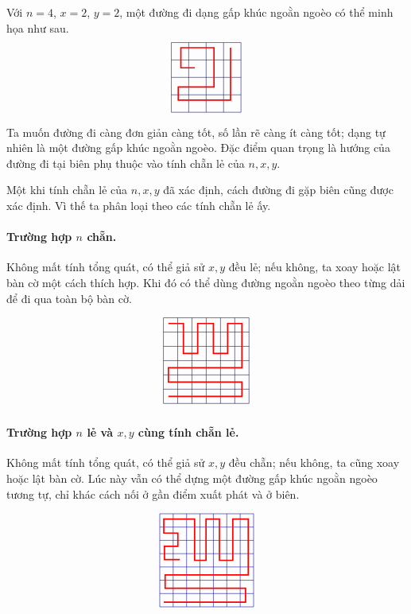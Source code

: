 \documentclass[11pt]{article}
\begin{document}
Với $n=4$, $x=2$, $y=2$, một đường đi dạng gấp khúc ngoằn ngoèo có thể minh
họa như sau.
\[
\begin{tikzpicture}[scale=0.55]
  \draw[step=1,blue!60!black] (0,0) grid (4,4);
  \draw[red,very thick]
    (3.4,3.7) -- (3.4,0.7) -- (0.4,0.7) -- (0.4,1.45)
    -- (2.45,1.45) -- (2.45,3.7) -- (0.55,3.7)
    -- (0.55,2.55) -- (1.35,2.55);
\end{tikzpicture}
\]
Ta muốn đường đi càng đơn giản càng tốt, số lần rẽ càng ít càng tốt; dạng tự
nhiên là một đường gấp khúc ngoằn ngoèo. Đặc điểm quan trọng là hướng của
đường đi tại biên phụ thuộc vào tính chẵn lẻ của $n,x,y$.

Một khi tính chẵn lẻ của $n,x,y$ đã xác định, cách đường đi gặp biên cũng được
xác định. Vì thế ta phân loại theo các tính chẵn lẻ ấy.

\paragraph{Trường hợp $n$ chẵn.}
Không mất tính tổng quát, có thể giả sử $x,y$ đều lẻ; nếu không, ta xoay hoặc
lật bàn cờ một cách thích hợp. Khi đó có thể dùng đường ngoằn ngoèo theo từng
dải để đi qua toàn bộ bàn cờ.

\[
\begin{tikzpicture}[scale=0.45]
  \draw[step=1,blue!60!black] (0,0) grid (6,6);
  \draw[red,very thick]
    (0.35,0.5) -- (5.5,0.5) -- (5.5,1.5) -- (0.35,1.5)
    -- (0.35,2.5) -- (5.5,2.5) -- (5.5,5.6)
    -- (4.5,5.6) -- (4.5,3.5) -- (3.5,3.5)
    -- (3.5,5.6) -- (2.4,5.6) -- (2.4,3.5)
    -- (1.4,3.5) -- (1.4,5.6) -- (0.35,5.6);
\end{tikzpicture}
\]

\paragraph{Trường hợp $n$ lẻ và $x,y$ cùng tính chẵn lẻ.}
Không mất tính tổng quát, có thể giả sử $x,y$ đều chẵn; nếu không, ta cũng
xoay hoặc lật bàn cờ. Lúc này vẫn có thể dựng một đường gấp khúc ngoằn ngoèo
tương tự, chỉ khác cách nối ở gần điểm xuất phát và ở biên.

\[
\begin{tikzpicture}[scale=0.42]
  \draw[step=1,blue!60!black] (0,0) grid (7,7);
  \draw[red,very thick]
    (0.3,0.35) -- (6.4,0.35) -- (6.4,1.4) -- (0.4,1.4)
    -- (0.4,2.4) -- (6.6,2.4) -- (6.6,6.6)
    -- (5.45,6.6) -- (5.45,3.5) -- (4.45,3.5)
    -- (4.45,6.6) -- (3.45,6.6) -- (3.45,3.5)
    -- (2.6,3.5) -- (2.6,6.6) -- (0.3,6.6)
    -- (0.3,5.55) -- (1.35,5.55) -- (1.35,4.55)
    -- (0.35,4.55) -- (0.35,3.55) -- (1.5,3.55);
\end{tikzpicture}
\]
\end{document}

